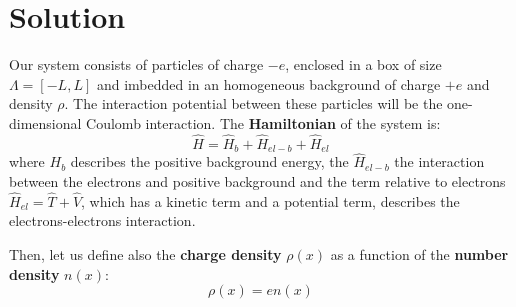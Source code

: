 \documentclass[11pt, a4paper, twoside, openright]{article}
\begin{document}
\section*{Solution}

Our system consists of particles of charge \( -e \), enclosed in a box of size \(\Lambda = [-L,L] \) and imbedded in an homogeneous background of charge \( +e \) and density \( \rho  \). The interaction potential between these particles will be the one-dimensional Coulomb interaction.
The \textbf{Hamiltonian} of the system is:
\begin{equation}
  \hat{H} = \hat{H}_b + \hat{H}_{el-b} + \hat{H}_{el}
\end{equation}
where \( H_b \) describes the positive background energy, the \( \hat{H}_{el-b} \) the interaction between the electrons and positive background and the term relative to electrons \( \hat{H}_{el} = \hat{T} + \hat{V}  \), which has a kinetic term and a potential term, describes the electrons-electrons interaction.

Then, let us define also the \textbf{charge density} \( \rho (x) \) as a function of the \textbf{number density} \( n(x) \):
\begin{equation}
  \rho (x) = e n (x)
\end{equation}
\end{document}
